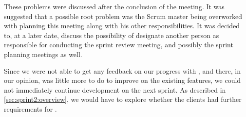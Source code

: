 These problems were discussed after the conclusion of the meeting. 
It was suggested that a possible root problem was the \giraf Scrum master being overworked with planning this meeting along with his other responsibilities.
It was decided to, at a later date, discuss the possibility of designate another person as responsible for conducting the sprint review meeting, and possibly the sprint planning meetings as well. 

Since we were not able to get any feedback on our progress with \launcher, and there, in our opinion, was little more to do to improve on the existing features, we could not immediately continue development on the next sprint. As described in \cref{sec:sprint2:overview}, we would have to explore whether the clients had further requirements for \launcher. 